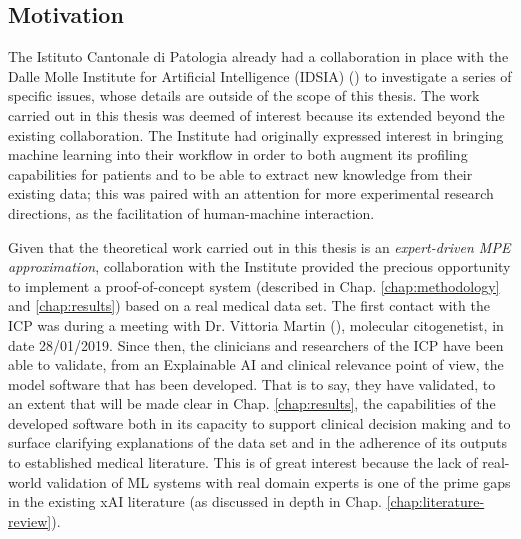 \subsection{Motivation} \label{subsec:motivation}
The Istituto Cantonale di Patologia already had a collaboration in place with the Dalle Molle Institute for Artificial Intelligence (IDSIA) (\cite{idsia}) to investigate a series of specific issues, whose details are outside of the scope of this thesis.
The work carried out in this thesis was deemed of interest because its extended beyond the existing collaboration.
The Institute had originally expressed interest in bringing machine learning into their workflow in order to both augment its profiling capabilities for patients and to be able to extract new knowledge from their existing data; this was paired with an attention for more experimental research directions, as the facilitation of human-machine interaction.

Given that the theoretical work carried out in this thesis is an \textit{expert-driven MPE approximation}, collaboration with the Institute provided the precious opportunity to implement a proof-of-concept system (described in Chap. \ref{chap:methodology} and \ref{chap:results}) based on a real medical data set.
The first contact with the ICP was during a meeting with Dr. Vittoria Martin (\cite{martin2012}), molecular citogenetist, in date 28/01/2019.
Since then, the clinicians and researchers of the ICP have been able to validate, from an Explainable AI and clinical relevance point of view, the model software that has been developed.
That is to say, they have validated, to an extent that will be made clear in Chap. \ref{chap:results}, the capabilities of the developed software both in its capacity to support clinical decision making and to surface clarifying explanations of the data set and in the adherence of its outputs to established medical literature.
This is of great interest because the lack of real-world validation of ML systems with real domain experts is one of the prime gaps in the existing xAI literature (as discussed in depth in Chap. \ref{chap:literature-review}).

